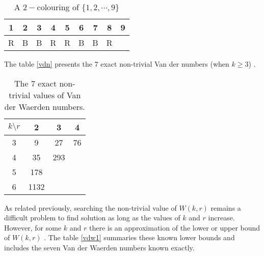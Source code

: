 \begin{table}[h]
\begin{center}
\begin{tabular}{ccccccccc}
\hline
1 & 2 & 3 & 4  & 5 & 6 & 7 & 8 & 9 \\ \hline
\color{red}R & \color{blue}B & \color{blue}B & \color{red}R & \color{red}R & \color{blue}B & \color{blue}B & \color{red}R  & \\
\hline 
\end{tabular} 
\end{center}
\caption{A $2-$colouring of $\{1,2,\cdots, 9\}$} \label{van23}
\end{table}

The table \eqref{vdn} presents the 7 exact non-trivial Van der numbers  (when $k\geq 3$) \citep{dransfield2004}.

\begin{table}[h]

\begin{center}
\begin{tabular}{|c|c|c|c|}
\hline 
$k \setminus r$ & 2 & 3 & 4  \\ 
\hline 
3 & 9 & 27 & 76  \\ 
\hline 
4 & 35 & 293 &   \\ 
\hline 
5 & 178 &  &   \\ 
\hline 
6 & 1132 &  &   \\ 
\hline 

\end{tabular}
\end{center}
\caption{The 7 exact non-trivial values of Van der Waerden numbers.} \label{vdn}
\end{table} 

As related previously, searching the non-trivial value of $W(k,r)$ remains a difficult problem to find solution as long as the values of $k$ and $r$ increase. However, for some $k$ and $r$ there is an approximation of the lower or upper bound of $W(k,r)$ \citep{stevens1978computer, herwig2007new, beeler1979some, dransfield2004, brown2008bounds, rabung2012, kouril2008van}. The table \eqref{vdw1} summaries these known lower bounds and includes the seven Van der Waerden numbers known exactly.


